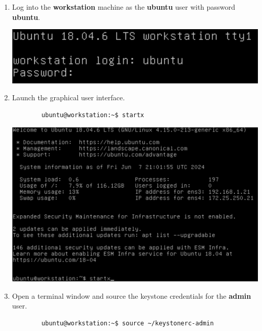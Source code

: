 \documentclass[letterpaper, 12pt]{article}
\begin{document}
\begin{enumerate}
    \item Log into the \textbf{workstation} machine as the \textbf{ubuntu} user with password \textbf{ubuntu}.

    \begin{center}
        \includegraphics[width=\linewidth]{images/part1/step1.png}
    \end{center}

    \item Launch the graphical user interface.
    \begin{lstlisting}
        ubuntu@workstation:~$ startx
    \end{lstlisting}

    \begin{center}
        \includegraphics[width=\linewidth]{images/part1/step2.png}
    \end{center}

    \item Open a terminal window and source the keystone credentials for the \textbf{admin} user.
    \begin{lstlisting}
        ubuntu@workstation:~$ source ~/keystonerc-admin
    \end{lstlisting}


\end{enumerate}
\end{document}
